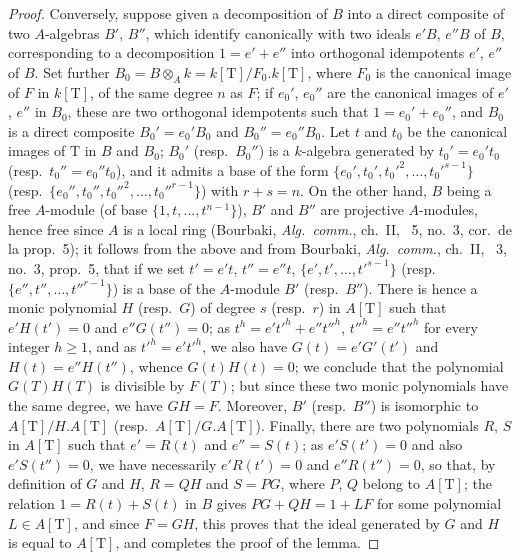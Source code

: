 \begin{proof}
Conversely, suppose given a decomposition of $B$ into a direct composite of two $A$-algebras $B'$, $B''$, which identify canonically with two ideals $e'B$, $e''B$ of $B$, corresponding to a decomposition $1=e'+e''$ into orthogonal idempotents $e'$, $e''$ of $B$.
Set further $B_0=B\otimes_A k=k[\mathrm{T}]/F_0.k[\mathrm{T}]$, where $F_0$ is the canonical image of $F$ in $k[\mathrm{T}]$, of the same degree $n$ as $F$;
if $e_0'$, $e_0''$ are the canonical images of $e'$, $e''$ in $B_0$, these are two orthogonal idempotents such that $1=e_0'+e_0''$, and $B_0$ is a direct composite $B_0'=e_0'B_0$ and $B_0''=e_0''B_0$.
Let $t$ and $t_0$ be the canonical images of $\mathrm{T}$ in $B$ and $B_0$;
$B_0'$ (resp.\ $B_0''$) is a $k$-algebra generated by $t_0'=e_0't_0$ (resp.\ $t_0''=e_0''t_0$), and it admits a base of the form $\{e_0',t_0',t_0'^2,\ldots,t_0'^{s-1}\}$ (resp.\ $\{e_0'',t_0'',t_0''^2,\ldots,t_0''^{r-1}\}$) with $r+s=n$.
On the other hand, $B$ being a free $A$-module (of base $\{1,t,\ldots,t^{n-1}\}$), $B'$ and $B''$ are projective $A$-modules, hence free since $A$ is a local ring (Bourbaki, \emph{Alg.\ comm.}, ch.~II, \textsection~5, no.~3, cor.\ de la prop.~5);
it follows from the above and from Bourbaki, \emph{Alg.\ comm.}, ch.~II, \textsection~3, no.~3, prop.~5, that if we set $t'=e't$, $t''=e''t$, $\{e',t',\ldots,t'^{s-1}\}$ (resp.\ $\{e'',t'',\ldots,t''^{r-1}\}$) is a base of the $A$-module $B'$ (resp.\ $B''$).
There is hence a monic polynomial $H$ (resp.\ $G$) of degree $s$ (resp.\ $r$) in $A[\mathrm{T}]$ such that $e'H(t')=0$ and $e''G(t'')=0$;
as $t^h=e't'^h+e''t''^h$, $t''^h=e''t''^h$ for every integer $h\geq 1$, and as $t'^h=e't'^h$, we also have $G(t)=e'G'(t')$ and $H(t)=e''H(t'')$, whence $G(t)H(t)=0$;
we conclude that the polynomial $G(T)H(T)$ is divisible by $F(T)$;
but since these two monic polynomials have the same degree, we have $GH=F$.
Moreover, $B'$ (resp.\ $B''$) is isomorphic to $A[\mathrm{T}]/H.A[\mathrm{T}]$ (resp.\ $A[\mathrm{T}]/G.A[\mathrm{T}]$).
Finally, there are two polynomials $R$, $S$ in $A[\mathrm{T}]$ such that $e'=R(t)$ and $e''=S(t)$;
as $e'S(t')=0$ and also $e'S(t'')=0$, we have necessarily $e'R(t')=0$ and $e''R(t'')=0$, so that, by definition of $G$ and $H$, $R=QH$ and $S=PG$, where $P$, $Q$ belong to $A[\mathrm{T}]$;
the relation $1=R(t)+S(t)$ in $B$ gives $PG+QH=1+LF$ for some polynomial $L\in A[\mathrm{T}]$, and since $F=GH$, this proves that the ideal generated by $G$ and $H$ is equal to $A[\mathrm{T}]$, and completes the proof of the lemma.
\end{proof}

